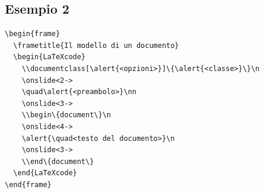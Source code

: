 \documentclass[a4paper,10pt]{article}
\begin{document}
\bigskip
\begin{center}
\end{center}

\newpage 
\subsection*{Esempio 2}\label{ex2}

\begin{Verbatim}[gobble=0]
\begin{frame}
  \frametitle{Il modello di un documento}
  \begin{LaTeXcode}
    \\documentclass[\alert{<opzioni>}]\{\alert{<classe>}\}\n
    \onslide<2->
    \quad\alert{<preambolo>}\nn
    \onslide<3->
    \\begin\{document\}\n
    \onslide<4->
    \alert{\quad<testo del documento>}\n
    \onslide<3->
    \\end\{document\}
  \end{LaTeXcode}
\end{frame}
\end{Verbatim}

\bigskip
\begin{center}
\end{center}
\end{document}
